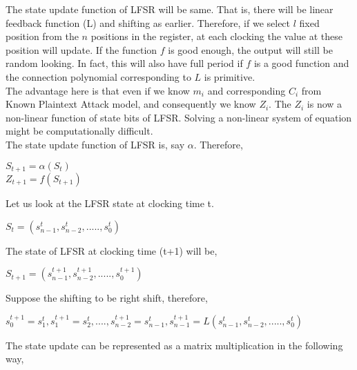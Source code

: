 \documentclass[11pt]{article}
\begin{document}
The state update function of LFSR will be same. That is, there will be linear feedback function (L) and shifting as earlier. Therefore, if we select $l$ fixed position from the $n$ positions in the register, at each clocking the value at these position will update. If the function $f$ is good enough, the output will still be random looking. In fact, this will also have full period if $f$ is a good function and the connection polynomial corresponding to $L$ is primitive.\\
\newline
The advantage here is that even if we know $m_i$ and corresponding $C_i$ from Known Plaintext Attack model, and consequently we know $Z_i$. The $Z_i$ is now a non-linear function of state bits of LFSR. Solving a non-linear system of equation might be computationally difficult.\\
\newline
The state update function of LFSR is, say $\alpha$. Therefore, 
\begin{center}
    $S_{t+1} = \alpha(S_t)$\\
    $Z_{t+1} = f(S_{t+1})$
\end{center}
Let us look at the LFSR state at clocking time t.
\begin{center}
    $S_t = (s_{n-1}^t, s_{n-2}^t,....., s_0^t)$
\end{center}
The state of LFSR at clocking time (t+1) will be, 
\begin{center}
    $S_{t+1} = (s_{n-1}^{t+1}, s_{n-2}^{t+1},....., s_0^{t+1})$
\end{center}
Suppose the shifting to be right shift, therefore, 
\begin{center}
    $s_0^{t+1} = s_1^t, s_1^{t+1} = s_2^t,....,s_{n-2}^{t+1} = s_{n-1}^t, s_{n-1}^{t+1} = L(s_{n-1}^t, s_{n-2}^t,....., s_0^t)$
\end{center}
The state update can be represented as a matrix multiplication in the following way,
\end{document}
